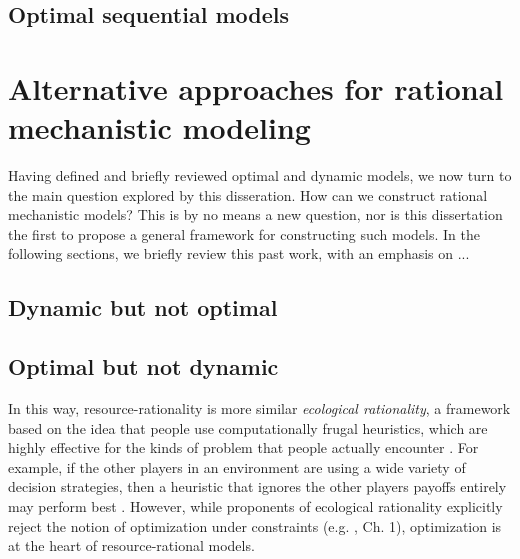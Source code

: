 


\subsection{Optimal sequential models}

\section{Alternative approaches for rational mechanistic modeling}

Having defined and briefly reviewed optimal and dynamic models, we now turn to the main question explored by this disseration. How can we construct rational mechanistic models? This is by no means a new question, nor is this dissertation the first to propose a general framework for constructing such models. In the following sections, we briefly review this past work, with an emphasis on ...

\subsection{Dynamic but not optimal}



\subsection{Optimal but not dynamic}




In this way, resource-rationality is more similar \emph{ecological rationality}, a framework based on the idea that people use computationally frugal heuristics, which are highly effective for the kinds of problem that people actually encounter \citep{gigerenzer1999simple,goldstein2002models,todd2012ecological}. For example, if the other players in an environment are using a wide variety of decision strategies, then a heuristic that ignores the other players payoffs entirely may perform best \citep{spiliopoulos2020map}. However, while proponents of ecological rationality explicitly reject the notion of optimization under constraints (e.g. \citealp{gigerenzer1999simple}, Ch. 1), optimization is at the heart of resource-rational models.



